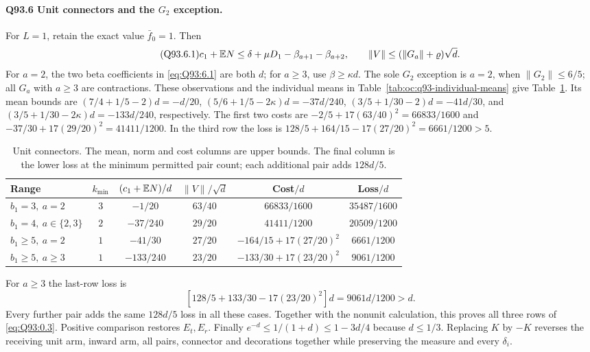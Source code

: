 \paragraph{Q93.6 Unit connectors and the \(G_2\) exception.}
For \(L=1\), retain the exact value \(\bar f_0=1\). Then
\begin{equation}\tag{Q93.6.1}\label{eq:Q93:6.1}
c_1+\mathbb E N\le\delta+\mu D_1-\beta_{a+1}-\beta_{a+2},\qquad
\|V\|\le(\|G_a\|+\varrho)\sqrt d.
\end{equation}
For $a=2$, the two beta coefficients in \eqref{eq:Q93:6.1}
are both $d$; for $a\ge3$, use $\beta\ge\kappa d$.
The sole $G_2$ exception is $a=2$, when $\|G_2\|\le6/5$;
all $G_a$ with $a\ge3$ are contractions. These observations and
the individual means in Table~\ref{tab:oc:q93-individual-means}
give Table~\ref{tab:oc:q93-unit-cost}. Its mean bounds are
$(7/4+1/5-2)d=-d/20$,
$(5/6+1/5-2\kappa)d=-37d/240$,
$(3/5+1/30-2)d=-41d/30$, and
$(3/5+1/30-2\kappa)d=-133d/240$, respectively.
The first two costs are
$-2/5+17(63/40)^2=66833/1600$ and
$-37/30+17(29/20)^2=41411/1200$.
In the third row the loss is
$128/5+164/15-17(27/20)^2=6661/1200>5$.
\begin{table}[htbp]
\centering\small
\setlength{\tabcolsep}{5pt}
\caption{Unit connectors. The mean, norm and cost columns are upper bounds. The final column is the lower loss at the minimum permitted pair count; each additional pair adds $128d/5$.}\label{tab:oc:q93-unit-cost}
\begin{tabular}{lccccc}
\toprule
Range & $k_{\min}$ & $(c_1+\mathbb E N)/d$ & $\|V\|/\sqrt d$ & Cost$/d$ & Loss$/d$\\
\midrule
$b_1=3,\ a=2$ & $3$ & $-1/20$ & $63/40$ & $66833/1600$ & $35487/1600$\\
$b_1=4,\ a\in\{2,3\}$ & $2$ & $-37/240$ & $29/20$ & $41411/1200$ & $20509/1200$\\
$b_1\ge5,\ a=2$ & $1$ & $-41/30$ & $27/20$ & $-164/15+17(27/20)^2$ & $6661/1200$\\
$b_1\ge5,\ a\ge3$ & $1$ & $-133/240$ & $23/20$ & $-133/30+17(23/20)^2$ & $9061/1200$\\
\bottomrule
\end{tabular}
\end{table}
For $a\ge3$ the last-row loss is
\begin{equation}\tag{Q93.6.2}\label{eq:Q93:6.2}
[128/5+133/30-17(23/20)^2]d=9061d/1200>d.
\end{equation}
Every further pair adds the same \(128d/5\) loss in all these cases.
Together with the nonunit calculation, this proves all three rows
of \eqref{eq:Q93:0.3}. Positive comparison restores \(E_t,E_r\).
Finally \(e^{-d}\le1/(1+d)\le1-3d/4\) because \(d\le1/3\).
Replacing \(K\) by \(-K\) reverses the receiving unit arm, inward arm,
all pairs, connector and decorations together while preserving the
measure and every \(\delta_i\).
